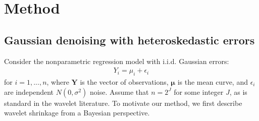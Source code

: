 \documentclass[12pt]{article}
\newcommand{\Ge}{\epsilon}
\newcommand{\s}{\sigma}
\begin{document}
\section{Method}
\subsection{Gaussian denoising with heteroskedastic errors}
Consider the nonparametric regression model with i.i.d. Gaussian errors:
\begin{eqnarray}\label{eq:1d gaussian model}
Y_i=\mu_i+\Ge_i
\end{eqnarray}
for $i=1,...,n$, where $\bm{Y}$ is the vector of observations, $\bm{\mu}$ is the mean curve, and $\Ge_i$ are independent $N(0,\s^2)$ noise. Assume that $n=2^J$ for some integer $J$, as is standard in the wavelet literature. To motivate our method, we first describe wavelet shrinkage from a Bayesian perspective.
\end{document}
